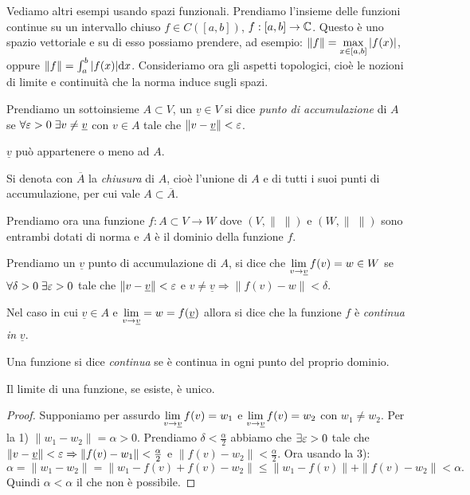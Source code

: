 Vediamo altri esempi usando spazi funzionali. Prendiamo l'insieme delle
funzioni continue su un intervallo chiuso $f \in C\left( [a, b] \right)$,
$f: [a, b] \to \mathbb C$. Questo è uno spazio vettoriale e su di esso possiamo
prendere, ad esempio: $\|f\| = \displaystyle \max_{x \in [a, b]} {\left|f(x)\right|}$,
oppure $\|f\| = \int_a^b {\left|f(x)\right|} \mathrm{d} x$.
Consideriamo ora gli aspetti topologici, cioè le nozioni di limite e continuità
che la norma induce sugli spazi.
\begin{definition}
Prendiamo un sottoinsieme $A \subset V$, un $\underline{v} \in V$ si dice
\emph{punto di accumulazione} di $A$ se $\forall \varepsilon > 0 \; \exists v \neq
\underline{v}$ con $v \in A$ tale che  $\|v - \underline{v}\| < \varepsilon$. 
\end{definition}
\begin{remark}
$\underline{v}$ può appartenere o meno ad $A$.
\end{remark}
\begin{definition}
Si denota con $\overline{A}$ la \emph{chiusura} di $A$, cioè l'unione di $A$ e
di tutti i suoi punti di accumulazione, per cui vale $A \subset \overline{A}$.
\end{definition}
Prendiamo ora una funzione $f: A \subset V \to W$ dove $\left(V, \| \; \| 
\right)$ e $\left(W, \| \; \| \right)$ sono entrambi dotati di norma e $A$ è
il dominio della funzione $f$.
\begin{definition}
Prendiamo un $\underline{v}$ punto di accumulazione di $A$, si dice che 
$\displaystyle \lim_{v \to \underline{v}} f(v) = w \in W$ se 
$\forall \delta > 0 \; \exists \varepsilon > 0$ tale che $ \|v - \underline{v}\| <
\varepsilon$ e $v \neq \underline{v} \Rightarrow \|f(v) - w\| < \delta$.
\end{definition}
\begin{definition}
Nel caso in cui $\underline{v} \in A$ e $\displaystyle \lim_{v \to 
\underline{v}} = w = f(\underline{v})$ allora si dice che la funzione $f$ è
\emph{continua in} $\underline{v}$.
\end{definition}
\begin{definition}[continuità]
Una funzione si dice \emph{continua} se è continua in ogni punto del proprio
dominio.
\end{definition}
\begin{theorem}
Il limite di una funzione, se esiste, è unico.
\end{theorem}
\begin{proof}
Supponiamo per assurdo $\displaystyle \lim_{v \to \underline{v}} f(v) = w_1$
e $\displaystyle \lim_{v \to \underline{v}} f(v) = w_2$ con $w_1 \neq w_2$.
Per la 1) $\|w_1 - w_2\| = \alpha > 0$. Prendiamo $\delta < \frac{\alpha}{2}$
abbiamo che $\exists \varepsilon > 0$ tale che $\|v - \underline{v}\| < \varepsilon
\Rightarrow \|f(v) - w_1\| < \frac{\alpha}{2}$ e $\|f(v) - w_2\| <
\frac{\alpha}{2}$. Ora usando la 3):
\[
	\alpha = \|w_1 - w_2\| = \|w_1 - f(v) + f(v) - w_2\| \leq \|w_1 - f(v)\| +
	\|f(v) - w_2\| < \alpha
.\] 
Quindi $\alpha < \alpha$ il che non è possibile.
\end{proof}

